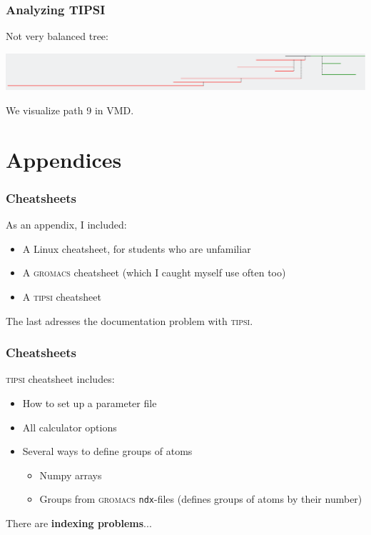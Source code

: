 \documentclass[hyperref={pdfpagelabels=false}]{beamer}
\begin{document}
\begin{frame}
\frametitle{Analyzing \textsc{TIPSI}} 
Not very balanced tree:
\begin{center}
\includegraphics[scale=0.2]{images/tree_dnabr.png}
\end{center}
We visualize path 9 in VMD.
\end{frame}

\section{Appendices}
\setcounter{subsection}{1}

\begin{frame}
\frametitle{Cheatsheets}
As an appendix, I included:
\begin{itemize}
\item A Linux cheatsheet, for students who are unfamiliar
\item A \textsc{gromacs} cheatsheet (which I caught myself use often too)
\item A \textsc{tipsi} cheatsheet
\end{itemize}
The last adresses the documentation problem with \textsc{tipsi}.
\end{frame}

\begin{frame}
\frametitle{Cheatsheets}
\textsc{tipsi} cheatsheet includes:
\begin{itemize}
\item How to set up a parameter file
\item All calculator options
\item Several ways to define groups of atoms
\begin{itemize}
\item Numpy arrays
\item Groups from \textsc{gromacs} \texttt{ndx}-files (defines groups of atoms by their number)
\end{itemize}
\end{itemize}
There are \textbf{indexing problems}...
\end{frame}
\end{document}
